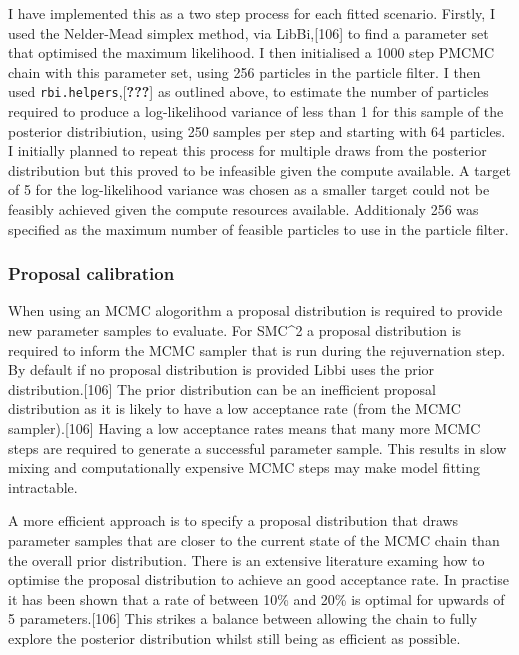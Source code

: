 \documentclass[11pt,twoside]{bristolthesis}
\begin{document}
  I have implemented this as a two step process for each fitted scenario. Firstly, I used the Nelder-Mead simplex method, via LibBi,{[}106{]} to find a parameter set that optimised the maximum likelihood. I then initialised a 1000 step PMCMC chain with this parameter set, using 256 particles in the particle filter. I then used \texttt{rbi.helpers},{[}{\textbf{???}}{]} as outlined above, to estimate the number of particles required to produce a log-likelihood variance of less than 1 for this sample of the posterior distribiution, using 250 samples per step and starting with 64 particles. I initially planned to repeat this process for multiple draws from the posterior distribution but this proved to be infeasible given the compute available. A target of 5 for the log-likelihood variance was chosen as a smaller target could not be feasibly achieved given the compute resources available. Additionaly 256 was specified as the maximum number of feasible particles to use in the particle filter.
  
  \hypertarget{proposal-calibration}{%
  \subsubsection{Proposal calibration}\label{proposal-calibration}}
  
  When using an MCMC alogorithm a proposal distribution is required to provide new parameter samples to evaluate. For SMC\^{}2 a proposal distribution is required to inform the MCMC sampler that is run during the rejuvernation step. By default if no proposal distribution is provided Libbi uses the prior distribution.{[}106{]} The prior distribution can be an inefficient proposal distribution as it is likely to have a low acceptance rate (from the MCMC sampler).{[}106{]} Having a low acceptance rates means that many more MCMC steps are required to generate a successful parameter sample. This results in slow mixing and computationally expensive MCMC steps may make model fitting intractable.
  
  A more efficient approach is to specify a proposal distribution that draws parameter samples that are closer to the current state of the MCMC chain than the overall prior distribution. There is an extensive literature examing how to optimise the proposal distribution to achieve an good acceptance rate. In practise it has been shown that a rate of between 10\% and 20\% is optimal for upwards of 5 parameters.{[}106{]} This strikes a balance between allowing the chain to fully explore the posterior distribution whilst still being as efficient as possible.
  
\end{document}
